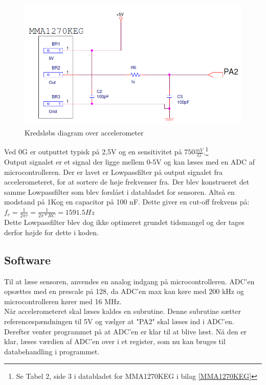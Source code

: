 \begin{figure}[h!]
\centering
\includegraphics[scale=0.6]{./Graphics/Accelerometer_diagram}
\caption{Kredsløbs diagram over accelerometer}
\label{diagram_acc}
\end{figure}

Ved 0G er outputtet typisk på 2,5V og en sensitivitet på $750\frac{mV}{G}$.\footnote{Se Tabel 2, side 3 i databladet for MMA1270KEG i bilag \ref{MMA1270KEG}} \\
Output signalet er et signal der ligge mellem 0-5V og kan læses med en ADC af microcontrolleren.
Der er lavet er Lowpassfilter på output signalet fra accelerometeret, for at sortere de høje frekvenser fra. Der blev konstrueret det samme Lowpassfilter som blev forslået i databladet for sensoren. Altså en modstand på 1K\ohm og en capacitor på 100 nF. Dette giver en cut-off frekvens på:\\$f_{c}=\frac{1}{2\pi\tau}=\frac{1}{2\pi*RC}=1591.5 Hz$\\
Dette Lowpassfilter blev dog ikke optimeret grundet tidsmangel og der tages derfor højde for dette i koden.\\

\subsection{Software}
Til at læse sensoren, anvendes en analog indgang på microcontrolleren. ADC'en opsættes med en prescale på 128, da ADC'en max kan køre med 200 kHz og microcontrolleren kører med 16 MHz. \\
Når accelerometeret skal læses kaldes en subrutine. Denne subrutine sætter referencespændningen til 5V og vælger at "PA2" skal læses ind i ADC'en. Derefter venter programmet på at ADC'en er klar til at blive læst. Nå den er klar, læses værdien af ADC'en over i et register, som nu kan bruges til databehandling i programmet.\\

